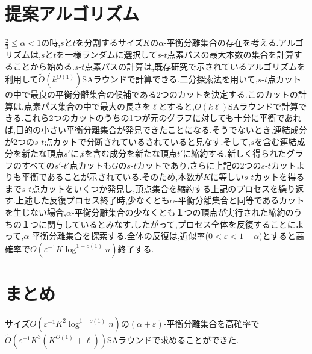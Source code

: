 \documentclass[a4j,twoside]{jarticle}
\begin{document}
\begin{論文概要}
\section{提案アルゴリズム}
$\frac{2}{3} \leq \alpha < 1$の時,$s$と$t$を分割するサイズ$K$の$\alpha$-平衡分離集合の存在を考える.アルゴリズムは,$s$と$t$を一様ランダムに選択して$s$-$t$点素パスの最大本数の集合を計算することから始める.$s$-$t$点素パスの計算は,既存研究で示されているアルゴリズム\cite{li2018distributed}を利用して$\tilde{O}(k^{O(1)})$SAラウンドで計算できる.二分探索法を用いて,$s$-$t$点カットの中で最良の平衡分離集合の候補である2つのカットを決定する.このカットの計算は,点素パス集合の中で最大の長さを$\ell$とすると,$O(k\ell)$SAラウンドで計算できる.これら2つのカットのうちの1つが元のグラフに対しても十分に平衡であれば,目的の小さい平衡分離集合が発見できたことになる.そうでないとき,連結成分が2つの$s$-$t$点カットで分断されているされていると見なす.そして,$s$を含む連結成分を新たな頂点$s'$に,$t$を含む成分を新たな頂点$t'$に縮約する.新しく得られたグラフのすべての$s'$-$t'$点カットも$G$の$s$-$t$カットであり,さらに上記の2つの$s$-$t$カットよりも平衡であることが示されている.そのため,本数が$K$に等しい$s$-$t$カットを得るまで$s$-$t$点カットをいくつか発見し,頂点集合を縮約する上記のプロセスを繰り返す.上述した反復プロセス終了時,少なくとも$\alpha$-平衡分離集合と同等であるカットを生じない場合,$\alpha$-平衡分離集合の少なくとも１つの頂点が実行された縮約のうちの１つに関与しているとみなす.したがって,プロセス全体を反復することによって,$\alpha$-平衡分離集合を探索する.全体の反復は,近似率($0 < \varepsilon < 1-\alpha$)とすると高確率で$O(\varepsilon^{-1}K\log^{1+o(1)}n)$終了する.
\section{まとめ}
サイズ$O(\varepsilon^{-1}K^2\log^{1+o(1)}n)$の$(\alpha + \varepsilon)$-平衡分離集合を高確率で$\tilde{O}(\varepsilon^{-1}K^3(K^{O(1)}+\ell))$SAラウンドで求めることができた.


\clearpage                       %
\end{論文概要}                   %
\end{document}
